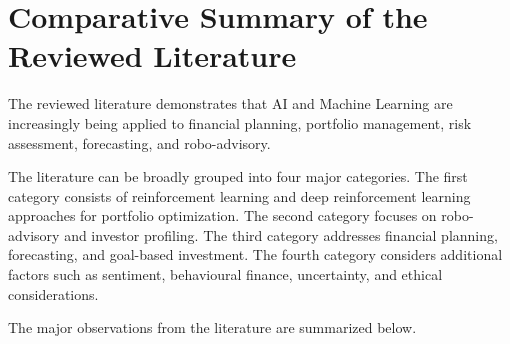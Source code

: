 \section{Comparative Summary of the Reviewed Literature}
The reviewed literature demonstrates that AI and Machine Learning are increasingly being applied to financial planning, portfolio management, risk assessment, forecasting, and robo-advisory.

The literature can be broadly grouped into four major categories. The first category consists of reinforcement learning and deep reinforcement learning approaches for portfolio optimization. The second category focuses on robo-advisory and investor profiling. The third category addresses financial planning, forecasting, and goal-based investment. The fourth category considers additional factors such as sentiment, behavioural finance, uncertainty, and ethical considerations.

The major observations from the literature are summarized below.

